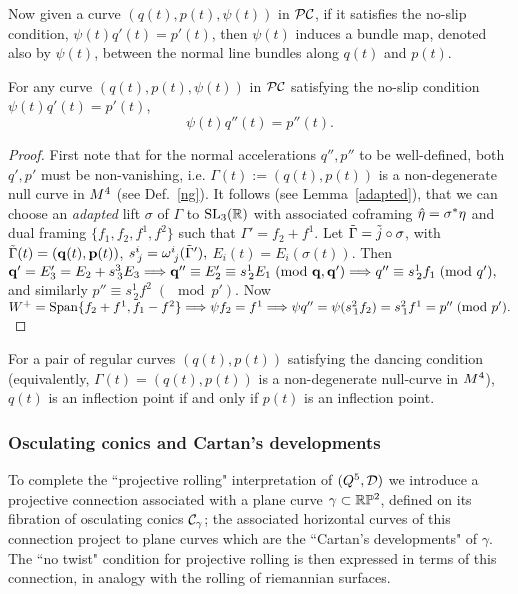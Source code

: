  Now given a curve $(q(t), p(t), \psi(t))$ in $\mathcal{PC}$, 
if it  satisfies the no-slip condition,  $\psi(t)q'(t)=p'(t)$,  
then $\psi(t)$ induces a bundle map, denoted also by $\psi(t)$,  
between the normal line bundles along $q(t)$ and $p(t)$.

 \begin{proposition}For any  curve $(q(t), p(t), \psi(t))$ in $\mathcal{PC}$ satisfying the no-slip condition $\psi(t)q'(t)=p'(t)$, $$\psi(t) q''(t)=p''(t).$$
 \end{proposition}
 
\begin{proof} First note that for the normal accelerations $q'', p''$
 to be well-defined, both $q', p'$ must be non-vanishing, 
 i.e.  $\Gamma(t):=(q(t), p(t))$ is a non-degenerate null curve 
 in $M^4$ (see Def.~\ref{ng}). It follows (see Lemma~\ref{adapted}), 
 that we can choose  an {\em adapted} lift $\sigma$ of $\Gamma$ to ${\mathrm{SL}_3(\mathbb{R})}$ with associated coframing  
 $\hat\eta=\sigma^*\eta$ and dual framing $\{f_1, f_2, f^1, f^2\}$ such that  
 $\Gamma'=f_2+f^1$. Let $\tilde \Gamma={\tilde j}\circ\sigma$, with $\tilde \Gamma(t)=(\mathbf q(t), {\mathbf p}(t))$, $s^i_{\,j}=\omega^{i}_{\;j}(\tilde \Gamma'),$ $E_i(t)=E_i(\sigma(t)).$ 
Then  $\mathbf q'=E_3'=E_2+s^3_{\,3}E_3\Longrightarrow \mathbf q''\equiv E_2'\equiv s^1_{\,2} E_1\;(\hbox{mod } \mathbf q, \mathbf q')\Longrightarrow
q''\equiv s^1_{\,2} f_1\;(\hbox{mod } q'),$ and similarly $p''\equiv s^1_{\,2} f^2\;(\mod p').$ Now $W^+=\mathrm{Span}\{f_2+f^1, f_1-f^2\}\Longrightarrow \psi f_2=f^1\Longrightarrow  \psi q''=\psi(s^2_{\,1}f_2)=s^2_{\,1}f^1=p'' \;(\hbox{mod } p').$
\end{proof}
 
 


\begin{cor}For a pair of regular curves $(q(t), p(t))$ satisfying the dancing condition (equivalently, 
$\Gamma(t)=(q(t), p(t))$ is a non-degenerate null-curve in $M^4$), $q(t)$ is an inflection point if and only if $p(t)$ is an inflection point. 
\end{cor}








\subsubsection{Osculating conics and Cartan's developments}\label{osc}
 To complete the ``projective rolling" interpretation of   $(Q^5,{\mathcal D})$ we introduce a  projective connection associated with a plane curve $\gamma\subset\mathbb{R}\mathbb{P}^2$, defined on  its fibration of osculating conics $\mathcal{C}_\gamma$; the  associated horizontal curves of this connection project to plane curves  which are the ``Cartan's developments" of $\gamma$. The ``no twist" condition for projective rolling is then   expressed in terms of this   connection, in analogy with the rolling of riemannian surfaces. 








